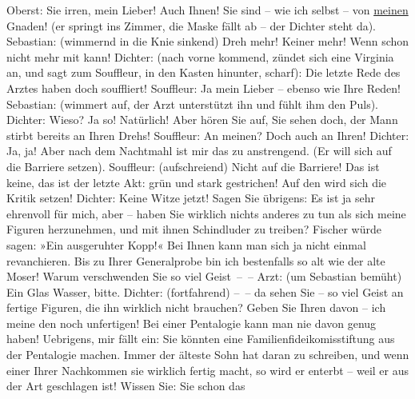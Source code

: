 \begin{ledgroupsized}[t]{13cm}
           \pstart
           Oberst: Sie irren, mein Lieber! Auch Ihnen! Sie sind – wie ich selbst – von \uline{meinen} Gnaden! (er springt ins Zimmer, die Maske
					fällt ab – der Dichter steht da).\pend
           \pstart
           Sebastian: (wimmernd in die Knie sinkend)  Dreh
					mehr! Keiner mehr! Wenn  schon nicht mehr mit
					kann!\pend
           \pstart
           Dichter: (nach vorne kommend, zündet sich eine Virginia an, und sagt zum
					Souffleur, in den Kasten hinunter, scharf): {\pb}Die letzte Rede des Arztes
					haben doch  souffliert!\pend
           \pstart
           Souffleur: Ja mein Lieber – ebenso wie Ihre Reden!\pend
           \pstart
           Sebastian: (wimmert auf, der Arzt unterstützt ihn und fühlt ihm den Puls).\pend
           \pstart
           Dichter: Wieso? Ja so! Natürlich! Aber hören Sie auf, Sie sehen doch, der Mann
					stirbt bereits an Ihren Drehs!\pend
           \pstart
           Souffleur: An meinen? Doch auch an Ihren!\pend
           \pstart
           Dichter: Ja, ja! Aber nach dem Nachtmahl ist mir das zu anstrengend. (Er will
					sich auf die Barriere setzen).\pend
           \pstart
           Souffleur: (aufschreiend) Nicht auf die Barriere! Das ist keine, das ist der
					letzte Akt: grün und stark gestrichen! Auf den wird sich die Kritik setzen!\pend
           \pstart
           Dichter: Keine Witze jetzt! Sagen Sie übrigens: Es ist ja sehr ehrenvoll für
					mich, aber – haben Sie wirklich nichts anderes zu tun als sich meine Figuren
					herzunehmen, und mit ihnen Schindluder zu treiben? Fischer würde sagen: »Ein ausgeruhter Kopp!« Bei Ihnen
					kann man sich ja nicht einmal revanchieren. Bis zu Ihrer Generalprobe bin ich
					bestenfalls so alt wie der alte Moser! Warum verschwenden Sie so viel
					Geist – –\pend
           \pstart
           Arzt: (um Sebastian bemüht) Ein Glas Wasser, bitte.\pend
           \pstart
           Dichter: (fortfahrend) – – da sehen Sie – so viel Geist an fertige Figuren,
					die ihn wirklich nicht brauchen? Geben Sie Ihren davon – ich meine den noch
					unfertigen! Bei einer Pentalogie kann man nie davon genug haben! Uebrigens, mir
					fällt ein: Sie könnten eine Familienfideikomisstiftung aus der Pentalogie machen. Immer der älteste Sohn hat daran
					zu schreiben, und wenn einer Ihrer Nachkommen sie wirklich fertig macht, so
						wird{ }{\pb}er enterbt – weil er aus der
					Art geschlagen ist! Wissen Sie:  Sie schon das

\end{ledgroupsized}
